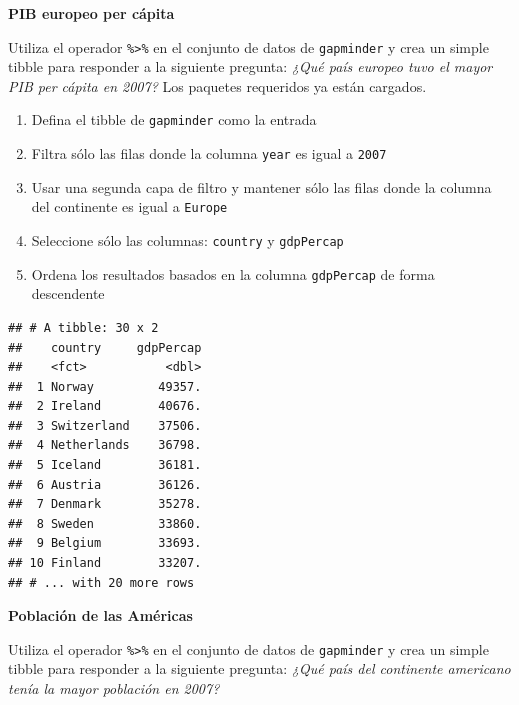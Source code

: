 \documentclass[
]{book}
\newenvironment{Shaded}{\begin{snugshade}}{\end{snugshade}}
\newcommand{\DecValTok}[1]{\textcolor[rgb]{0.00,0.00,0.81}{#1}}
\newcommand{\KeywordTok}[1]{\textcolor[rgb]{0.13,0.29,0.53}{\textbf{#1}}}
\newcommand{\NormalTok}[1]{#1}
\newcommand{\OperatorTok}[1]{\textcolor[rgb]{0.81,0.36,0.00}{\textbf{#1}}}
\newcommand{\StringTok}[1]{\textcolor[rgb]{0.31,0.60,0.02}{#1}}
\providecommand{\tightlist}{%
  \setlength{\itemsep}{0pt}\setlength{\parskip}{0pt}}
\begin{document}
\textbf{PIB europeo per cápita}

Utiliza el operador \texttt{\%\textgreater{}\%} en el conjunto de datos de \texttt{gapminder} y crea un simple tibble para responder a la siguiente pregunta: \emph{¿Qué país europeo tuvo el mayor PIB per cápita en 2007?} Los paquetes requeridos ya están cargados.

\begin{enumerate}
\def\labelenumi{\arabic{enumi}.}
\tightlist
\item
  Defina el tibble de \texttt{gapminder} como la entrada
\item
  Filtra sólo las filas donde la columna \texttt{year} es igual a \texttt{2007}
\item
  Usar una segunda capa de filtro y mantener sólo las filas donde la columna del continente es igual a \texttt{Europe}
\item
  Seleccione sólo las columnas: \texttt{country} y \texttt{gdpPercap}
\item
  Ordena los resultados basados en la columna \texttt{gdpPercap} de forma descendente
\end{enumerate}

\begin{Shaded}
\end{Shaded}

\begin{verbatim}
## # A tibble: 30 x 2
##    country     gdpPercap
##    <fct>           <dbl>
##  1 Norway         49357.
##  2 Ireland        40676.
##  3 Switzerland    37506.
##  4 Netherlands    36798.
##  5 Iceland        36181.
##  6 Austria        36126.
##  7 Denmark        35278.
##  8 Sweden         33860.
##  9 Belgium        33693.
## 10 Finland        33207.
## # ... with 20 more rows
\end{verbatim}

\textbf{Población de las Américas}

Utiliza el operador \texttt{\%\textgreater{}\%} en el conjunto de datos de \texttt{gapminder} y crea un simple tibble para responder a la siguiente pregunta: \emph{¿Qué país del continente americano tenía la mayor población en 2007?}
\end{document}
